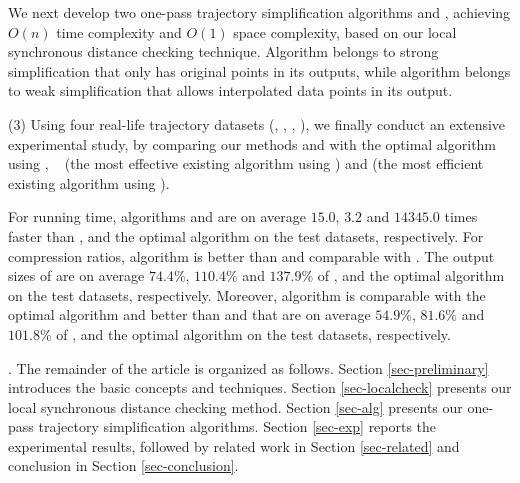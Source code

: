 
 We next develop two one-pass trajectory simplification algorithms \cist and \cista, achieving $O(n)$ time complexity and $O(1)$ space complexity, based on our local synchronous distance checking technique.
Algorithm \cist belongs to strong simplification that only has original points in its outputs, while algorithm \cista belongs to weak simplification that allows interpolated data points in its output.


\sstab (3) Using four real-life trajectory datasets (\truck, \sercar, \geolife, \pricar),
we finally conduct an extensive experimental study, by comparing our methods \cist and \cista  with the optimal \lsa algorithm using \sed, \dps~\cite{Meratnia:Spatiotemporal} (the most effective existing \lsa algorithm using \sed) and \squishe \cite{Muckell:Compression} (the most efficient existing \lsa algorithm using \sed).

For running time,
algorithms \cist and \cista are on average $15.0$, $3.2$ and $14345.0$ times faster than \dps, \squishe and the optimal \lsa algorithm on the test datasets, respectively.
%
For compression ratios, algorithm \cist is better than \squishe and comparable with \dps. The output sizes of \cist are on average $74.4\%$, $110.4\%$ and $137.9\%$ of \squishe, \dps and the optimal \lsa algorithm on the test datasets, respectively.
Moreover, algorithm \cista is comparable with the optimal \lsa algorithm and better than \squishe and \dps that are on average $54.9\%$, $81.6\%$ and $101.8\%$ of \squishe, \dps and the optimal \lsa algorithm on the test datasets, respectively.


.
The remainder of the article is organized as follows.
Section \ref{sec-preliminary} introduces the basic concepts and techniques.
Section \ref{sec-localcheck} presents our local synchronous distance checking method.
Section \ref{sec-alg} presents our one-pass trajectory simplification algorithms.
Section \ref{sec-exp} reports the experimental results, followed by related work in
Section \ref{sec-related} and conclusion in Section \ref{sec-conclusion}.





